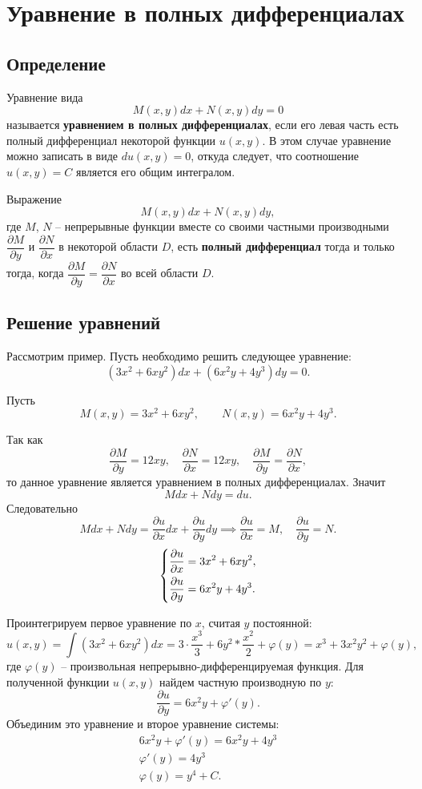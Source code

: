 \documentclass[a5paper, 11pt]{extbook}
\theoremstyle{definition}
\theoremstyle{definition}
\begin{document}
\section{Уравнение в полных дифференциалах}

\subsection{Определение}

Уравнение вида
\[
    M(x, y) dx + N(x, y)dy = 0
\]
называется \textbf{уравнением в полных дифференциалах}, если его левая часть есть полный дифференциал некоторой функции \(u(x, y)\). В этом случае уравнение можно записать в виде \(du(x, y) = 0\), откуда следует, что соотношение \(u(x, y) = C\) является его общим интегралом.

Выражение
\[
    M(x, y)dx + N(x, y)dy,
\]
где \(M\), \(N\) -- непрерывные функции вместе со своими частными производными \(\dfrac{\partial M}{\partial y}\) и \(\dfrac{\partial N}{\partial x}\) в некоторой области \(D\), есть \textbf{полный дифференциал} тогда и только тогда, когда \(\dfrac{\partial M}{\partial y} = \dfrac{\partial N}{\partial x}\) во всей области \(D\).

\subsection{Решение уравнений}

Рассмотрим пример. Пусть необходимо решить следующее уравнение:
\[
    (3x^2 + 6xy^2) dx + (6x^2y + 4y^3) dy = 0.
\]

Пусть
\[
    M(x, y) = 3x^2 + 6xy^2,
    \qquad
    N(x, y) = 6x^2y + 4y^3.
\]

Так как
\[
    \frac{\partial M}{\partial y} = 12xy,
    \quad
    \frac{\partial N}{\partial x} = 12xy,
    \quad
    \frac{\partial M}{\partial y} = \frac{\partial N}{\partial x},
\]
то данное уравнение является уравнением в полных дифференциалах. Значит
\[
    Mdx + Ndy = du.
\]
Следовательно
\[
    Mdx + Ndy = \frac{\partial u}{\partial x} dx + \frac{\partial u}{\partial y}dy
    \implies
    \frac{\partial u}{\partial x} = M,
    \quad
    \frac{\partial u}{\partial y} = N.
\]
\[
    \begin{dcases}
        \frac{\partial u}{\partial x} = 3x^2 + 6xy^2, \\
        \frac{\partial u}{\partial y} = 6x^2y + 4y^3.
    \end{dcases}
\]

Проинтегрируем первое уравнение по \(x\), считая \(y\) постоянной:
\[
    u(x, y) =
    \int (3x^2 + 6xy^2)dx =
    3 \cdot \frac{x^3}{3} + 6y^2 * \frac{x^2}{2} + \varphi(y) =
    x^3 + 3x^2y^2 + \varphi(y),
\]
где \(\varphi(y)\) -- произвольная непрерывно-дифференцируемая функция. Для полученной функции \(u(x, y)\) найдем частную производную по \(y\):
\[
    \frac{\partial u}{\partial y} = 6x^2y + \varphi'(y).
\]
Объединим это уравнение и второе уравнение системы:
\begin{gather*}
    6x^2y + \varphi'(y) = 6x^2y + 4y^3 \\
    \varphi'(y) = 4y^3 \\
    \varphi(y) = y^4 + C.
\end{gather*}
\end{document}
